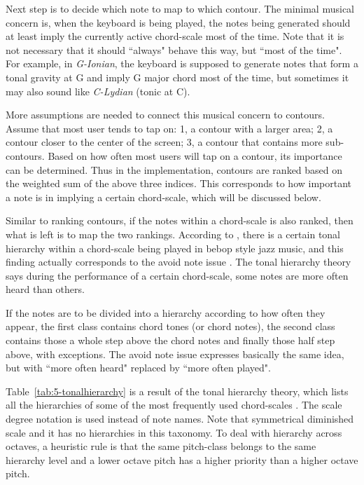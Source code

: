Next step is to decide which note to map to which contour. The minimal musical concern is, when the keyboard is being played, the notes being generated should at least imply the currently active chord-scale most of the time. Note that it is not necessary that it should ``always" behave this way, but ``most of the time". For example, in \textit{G-Ionian}, the keyboard is supposed to generate notes that form a tonal gravity at G and imply G major chord most of the time, but sometimes it may also sound like \textit{C-Lydian} (tonic at C).

More assumptions are needed to connect this musical concern to contours. Assume that most user tends to tap on: 1, a contour with a larger area; 2, a contour closer to the center of the screen; 3, a contour that contains more sub-contours. Based on how often most users will tap on a contour, its importance can be determined. Thus in the implementation, contours are ranked based on the weighted sum of
the above three indices. This corresponds to how important a note is in implying a certain chord-scale, which will be discussed below.

Similar to ranking contours, if the notes within a chord-scale is also ranked, then what is left is to map the two rankings. According to \cite{jarvinen1995tonal}, there is a certain tonal hierarchy within a chord-scale being played in bebop style jazz music, and this finding actually corresponds to the avoid note issue \cite{nettles1987harmony}. The tonal hierarchy theory says during the performance of a certain chord-scale, some notes are more often heard than others.

If the notes are to be divided into a hierarchy according to how often they appear, the first class contains chord tones (or chord notes), the second class contains those a whole step above the chord notes and finally those half step above, with exceptions. The avoid note issue expresses basically the same idea, but with ``more often heard" replaced by ``more often played".

Table~\ref{tab:5-tonalhierarchy} is a result of the tonal hierarchy theory, which lists all the hierarchies \cite{nettles1987harmony} of some of the most frequently used chord-scales \cite{burtonJazzImpro}. The scale degree notation is
used instead of note names. Note that symmetrical diminished scale and it has no hierarchies in this taxonomy. To deal with hierarchy across octaves, a heuristic rule is that the same pitch-class belongs to the same hierarchy level and a lower octave pitch has a higher priority than a higher octave pitch.

